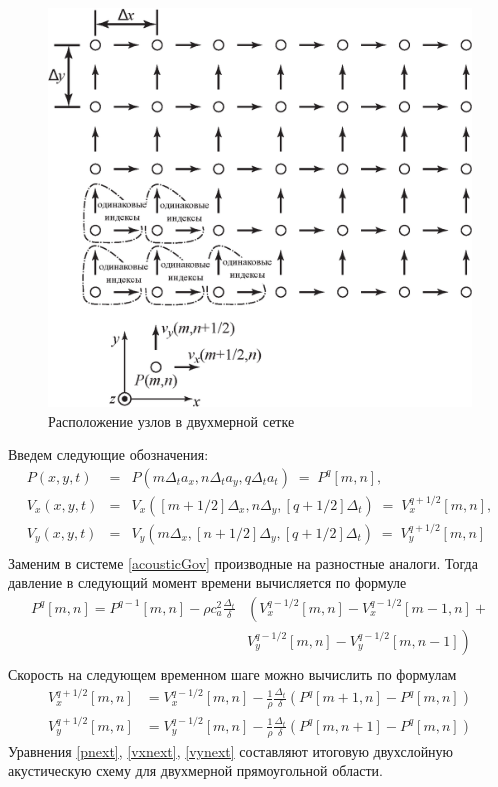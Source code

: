\documentclass[a4paper, fontsize=14pt]{article}
\begin{document}
\begin{figure}[h]
	\centering
	\includegraphics[width=0.75\columnwidth]{acoustic-2d-grid-ru.eps}
	\caption{Расположение узлов в двухмерной сетке}
	\label{grid2d}
\end{figure}

Введем следующие обозначения:
\begin{eqnarray*}
P(x,y,t) & = & P(m\Delta_ta_x,n \Delta_ta_y,  q\Delta_ta_t) \;=\;
 P^q[m,n],\\
V_x(x,y,t) & = & 
  V_x\left([m+1/2]\Delta_x,n \Delta_y,  [q+1/2]\Delta_t\right)
  \;=\; V_x^{q+1/2}[m,n], \\
V_y(x,y,t) & = & 
  V_y\left(m\Delta_x,[n+1/2] \Delta_y,  [q+1/2]\Delta_t\right)
  \;=\; V_y^{q+1/2}[m,n] \\
\end{eqnarray*}
Заменим в системе \ref{acousticGov} производные на разностные аналоги. Тогда давление в следующий
момент времени вычисляется по формуле
\begin{equation}
    \label{pnext}
\begin{aligned}
P^q[m,n] = P^{q-1}[m,n] -
        \rho c_a^2 \frac{\Delta_t}{\delta}
	& \left( V_x^{q-1/2}[m,n]-V_x^{q-1/2}[m-1,n]+\mbox{}\right.\\
	& \left. V_y^{q-1/2}[m,n]-V_y^{q-1/2}[m,n-1]\mbox{}\right)\\          
\end{aligned}
\end{equation}
Скорость на следующем временном шаге можно вычислить по формулам
\begin{align}
    \label{vxnext}
	V_x^{q+1/2}[m,n] &= V_x^{q-1/2}[m,n]
               -\frac{1}{\rho}\frac{\Delta_t}{\delta}
                \left(P^q[m+1,n]-P^q[m,n]\right)\\
    \label{vynext}
	V_y^{q+1/2}[m,n] &= V_y^{q-1/2}[m,n]
               -\frac{1}{\rho}\frac{\Delta_t}{\delta}
                \left(P^q[m,n+1]-P^q[m,n]\right)
\end{align}
Уравнения \ref{pnext}, \ref{vxnext}, \ref{vynext} составляют итоговую двухслойную акустическую схему
для двухмерной прямоугольной области.
\end{document}
